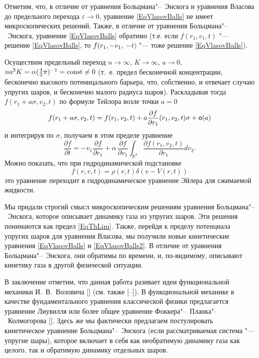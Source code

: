Отметим, что, в отличие от уравнения Больцмана"--~Энскога и уравнения Власова до предельного перехода $\varepsilon\to0$, уравнение \eqref{EqVlasovBalls} не имеет микроскопических решений. Также, в отличие от уравнения Больцмана"--~Энскога, уравнение \eqref{EqVlasovBalls}  обратимо (т.е. если $f(r_1,v_1,t)$ "--- решение \eqref{EqVlasovBalls}, то $f(r_1,-v_1, \linebreak $ $-t)$ "--- тоже решение \eqref{EqVlasovBalls}).

Осуществим предельный переход $n\to\infty$, $K\to\infty$, $a\to0$, $na^3K=\alpha(\frac43\pi)^{-1}=\rm const\neq0$ (т.~е. предел бесконечной концентрации, бесконечно высокого потеницального барьера, что, собственно, и отвечает случаю упругих шаров, и бесконечно малого радиуса шаров). Раскладывая тогда $f(r_1+a\sigma,v_2,t)$ по формуле Тейлора возле точки $a=0$
$$f(r_1+a\sigma,v_2,t)=f(r_1,v_2,t)+a\frac{\partial f}{\partial r_1}(r_1,v_2,t)\sigma+{\sf o}(a)$$
и интегрируя по $\sigma$, получаем   в этом пределе уравнение
\begin{equation}\label{EqVlasovBalls2}
\frac{\partial f}{\partial t}=-v_1\frac{\partial f}{\partial r_1}+\alpha\,\frac{\partial f}{\partial v_1}\int_{\mathbb R^3}\frac{\partial f(r_1,v_2,t)}{\partial r_1}dv_2.
\end{equation}
Можно показать, что при гидродинамической подстановке $$f(r,v,t)=\rho(r,t)\delta(v-V(r,t))$$ это уравнение переходит в гидродинамическое уравнение Эйлера для сжимаемой жидкости.

\smallskip

Мы придали строгий смысл микроскопическим решениям уравнения Больцмана"--~Энскога, которое описывает динамику газа из упругих шаров. Эти решения понимаются как предел \eqref{EqThLim}. 
Также, перейдя к пределу потенциала упругих шаров для уравнения Власова, мы получили новые кинетические уравнения \eqref{EqVlasovBalls} и \eqref{EqVlasovBalls2}. 
В отличие от уравнения Больцмана"--~Энскога, они обратимы по времени, и, по-видимому, описывают кинетику газа в другой физической ситуации.

В заключение отметим, что данная работа разивает идеи функциональной механики И.~В.~Воловича [] (см. также [--]). В функциональной механике в качестве фундаментального уравнения классической физики предлагается уравнение Лиувилля или более общее уравнение Фоккера"--~Планка"--~Колмогорова []. Здесь же мы фактически предлагаем постулировать кинетическое уравнение Больцмана"--~Энскога (если рассматриваемая система "--- упругие шары), которое включает в себя как необратимую динамику газа как целого, так и обратимую динамику отдельных шаров.

